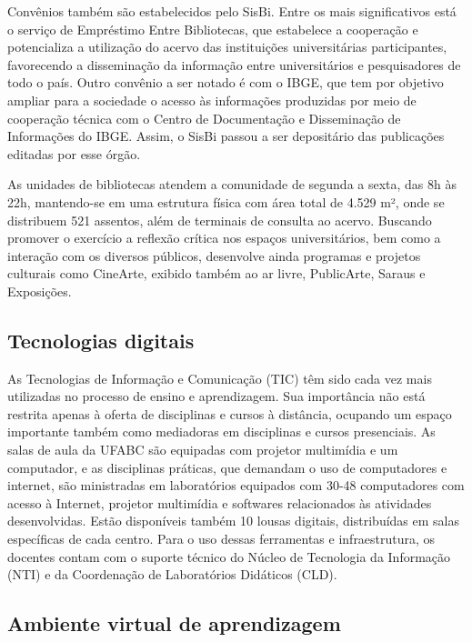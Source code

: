 Convênios também são estabelecidos pelo SisBi.
Entre os mais significativos está o serviço de Empréstimo Entre Bibliotecas,
que estabelece a cooperação e potencializa a utilização do acervo das
instituições universitárias participantes, favorecendo a disseminação da
informação entre universitários e pesquisadores de todo o país. 
Outro convênio a ser notado é com o IBGE, que tem por objetivo ampliar para a
sociedade o acesso às informações produzidas por meio de cooperação técnica
com o Centro de Documentação e Disseminação de Informações do IBGE.
Assim, o SisBi passou a ser depositário das publicações editadas por esse órgão.

As unidades de bibliotecas atendem a comunidade de segunda a sexta, das 8h às
22h, mantendo-se em uma estrutura física com área total de 4.529 m², onde se
distribuem 521 assentos, além de terminais de consulta ao acervo.
Buscando promover o exercício a reflexão crítica nos espaços universitários,
bem como a interação com os diversos públicos, desenvolve ainda programas e
projetos culturais como CineArte, exibido também ao ar livre, PublicArte,
Saraus e Exposições.

\subsection{Tecnologias digitais}

As Tecnologias de Informação e Comunicação (TIC) têm sido cada vez mais
utilizadas no processo de ensino e aprendizagem.
Sua importância não está restrita apenas à oferta de disciplinas e cursos
à distância, ocupando um espaço importante
também como mediadoras em disciplinas e cursos presenciais.
As salas de aula da UFABC são equipadas com projetor multimídia e um
computador, e as disciplinas práticas, que demandam o uso de computadores e
internet, são ministradas em laboratórios equipados com 30-48 computadores com
acesso à Internet, projetor multimídia e softwares relacionados às atividades
desenvolvidas. 
Estão disponíveis também 10 lousas digitais, distribuídas em salas específicas
de cada centro. 
Para o uso dessas ferramentas e infraestrutura, os docentes contam com o
suporte técnico do Núcleo de Tecnologia da Informação (NTI) e da Coordenação de
Laboratórios Didáticos (CLD).

\subsection{Ambiente virtual de aprendizagem}

